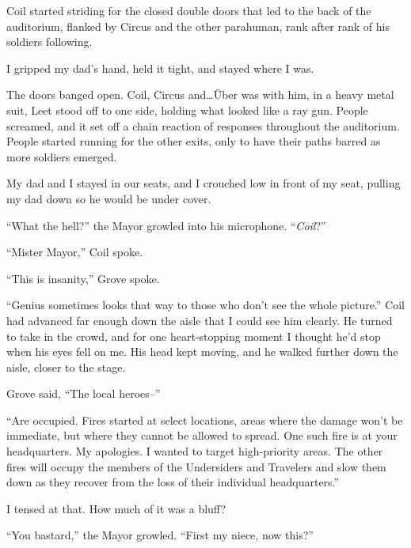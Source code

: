 Coil started striding for the closed double doors that led to the back of the auditorium, flanked by Circus and the other parahuman, rank after rank of his soldiers following.



I gripped my dad's hand, held it tight, and stayed where I was.



The doors banged open.  Coil, Circus and\ldots \"{U}ber was with him, in a heavy metal suit, Leet stood off to one side, holding what looked like a ray gun.  People screamed, and it set off a chain reaction of responses throughout the auditorium.  People started running for the other exits, only to have their paths barred as more soldiers emerged.



My dad and I stayed in our seats, and I crouched low in front of my seat, pulling my dad down so he would be under cover.



``What the hell?'' the Mayor growled into his microphone.  ``\emph{Coil}?''



``Mister Mayor,'' Coil spoke.



``This is insanity,'' Grove spoke.



``Genius sometimes looks that way to those who don't see the whole picture.''  Coil had advanced far enough down the aisle that I could see him clearly.  He turned to take in the crowd, and for one heart-stopping moment I thought he'd stop when his eyes fell on me.  His head kept moving, and he walked further down the aisle, closer to the stage.



Grove said, ``The local heroes--''



``Are occupied.  Fires started at select locations, areas where the damage won't be immediate, but where they cannot be allowed to spread.  One such fire is at your headquarters.  My apologies.  I wanted to target high-priority areas.  The other fires will occupy the members of the Undersiders and Travelers and slow them down as they recover from the loss of their individual headquarters.''



I tensed at that.  How much of it was a bluff?



``You bastard,'' the Mayor growled.  ``First my niece, now this?''



